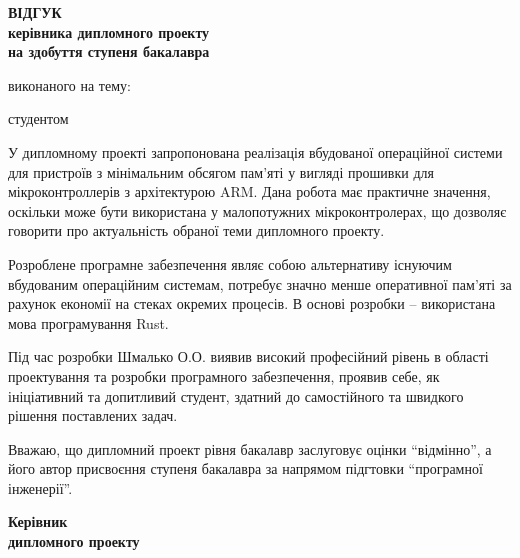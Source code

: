 \documentclass[main.tex]{subfiles}
\begin{document}
\begin{otherspecialpage}
  \begin{singlespacing}
  \begin{center}
    \textbf{
      {\large ВІДГУК}\\
      керівника дипломного проекту\\
      на здобуття ступеня бакалавра
    }\\
  \end{center}

  \noindent виконаного на тему: 

  \noindent студентом \fillinline{}\\\vspace{5mm}
  \end{singlespacing}


  У дипломному проекті запропонована реалізація вбудованої операційної системи для пристроїв з мінімальним обсягом пам'яті у вигляді прошивки для мікроконтроллерів з архітектурою ARM. Дана робота має практичне значення, оскільки може бути використана у малопотужних мікроконтролерах, що дозволяє говорити про актуальність обраної теми дипломного проекту.

  Розроблене програмне забезпечення являє собою альтернативу існуючим вбудованим операційним системам, потребує значно менше оперативної пам'яті за рахунок економії на стеках окремих процесів. В основі розробки – використана мова програмування Rust.

  Під час розробки Шмалько О.О. виявив високий професійний рівень в області проектування та розробки програмного забезпечення, проявив себе, як ініціативний та допитливий студент, здатний до самостійного та швидкого рішення поставлених задач.

  Вважаю, що дипломний проект рівня бакалавр заслуговує оцінки ``відмінно'', а його автор присвоєння ступеня бакалавра за напрямом підгтовки ``програмної інженерії''.\\

  \vfill

  \noindent
  \textbf{Керівник\\
    дипломного проекту}\\
  \hfill
  \fillin[(підпис)]{\hspace{22mm}}
  \hfill

  \vfill
\end{otherspecialpage}
\end{document}
